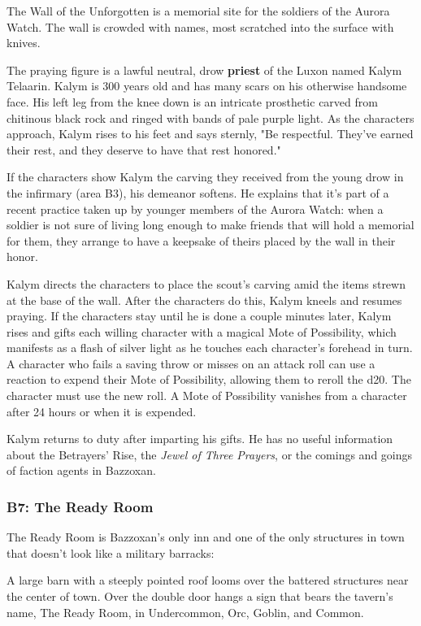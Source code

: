 \documentclass[10pt,a4paper,twoside,bg=print,twocolumn,openany,nodeprecatedcode]{dndbook}
\begin{document}
The Wall of the Unforgotten is a memorial site for the soldiers of the Aurora Watch. The wall is crowded with names, most scratched into the surface with knives.

The praying figure is a lawful neutral, drow \textbf{priest} of the Luxon named Kalym Telaarin. Kalym is 300 years old and has many scars on his otherwise handsome face. His left leg from the knee down is an intricate prosthetic carved from chitinous black rock and ringed with bands of pale purple light. As the characters approach, Kalym rises to his feet and says sternly, "Be respectful. They've earned their rest, and they deserve to have that rest honored."

If the characters show Kalym the carving they received from the young drow in the infirmary (area B3), his demeanor softens. He explains that it's part of a recent practice taken up by younger members of the Aurora Watch: when a soldier is not sure of living long enough to make friends that will hold a memorial for them, they arrange to have a keepsake of theirs placed by the wall in their honor.

Kalym directs the characters to place the scout's carving amid the items strewn at the base of the wall. After the characters do this, Kalym kneels and resumes praying. If the characters stay until he is done a couple minutes later, Kalym rises and gifts each willing character with a magical Mote of Possibility, which manifests as a flash of silver light as he touches each character's forehead in turn. A character who fails a saving throw or misses on an attack roll can use a reaction to expend their Mote of Possibility, allowing them to reroll the d20. The character must use the new roll. A Mote of Possibility vanishes from a character after 24 hours or when it is expended.

Kalym returns to duty after imparting his gifts. He has no useful information about the Betrayers' Rise, the \textit{Jewel of Three Prayers}, or the comings and goings of faction agents in Bazzoxan.

\subsubsection{B7: The Ready Room}
The Ready Room is Bazzoxan's only inn and one of the only structures in town that doesn't look like a military barracks:

\begin{DndReadAloud}{}
A large barn with a steeply pointed roof looms over the battered structures near the center of town. Over the double door hangs a sign that bears the tavern's name, The Ready Room, in Undercommon, Orc, Goblin, and Common.

\end{DndReadAloud}
\end{document}
